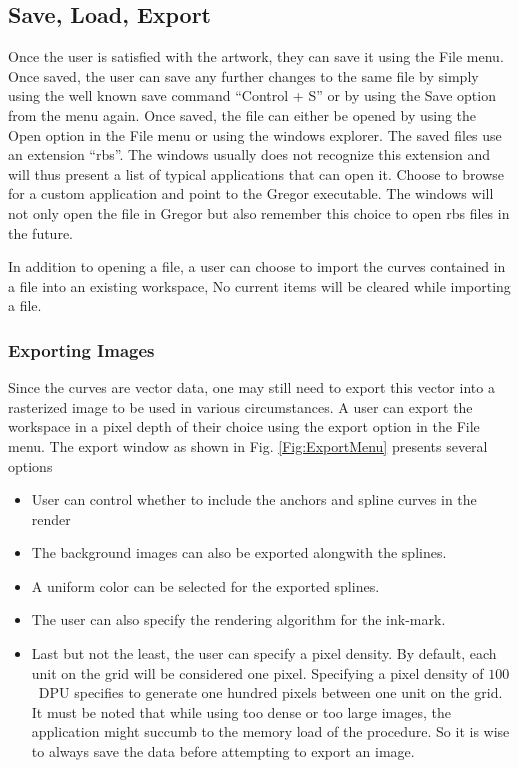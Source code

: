 \subsection{Save, Load, Export}
{
    Once the user is satisfied with the artwork, they can save it using the File menu. Once saved, the user can save any further changes to the same file by simply using the well known save command ``Control + S'' or by using the Save option from the menu again. Once saved, the file can either be opened by using the Open option in the File menu or using the windows explorer. The saved files use an extension ``rbs''. The windows usually does not recognize this extension and will thus present a list of typical applications that can open it. Choose to browse for a custom application and point to the Gregor executable. The windows will not only open the file in Gregor but also remember this choice to open rbs files in the future.

    In addition to opening a file, a user can choose to import the curves contained in a file into an existing workspace, No current items will be cleared while importing a file.

    \subsubsection{Exporting Images}
    {
        Since the curves are vector data, one may still need to export this vector into a rasterized image to be used in various circumstances. A user can export the workspace in a pixel depth of their choice using the export option in the File menu. The export window as shown in Fig. \ref{Fig:ExportMenu} presents several options
        \begin{itemize}
          \item User can control whether to include the anchors and spline curves in the render
          \item The background images can also be exported alongwith the splines.
          \item A uniform color can be selected for the exported splines.
          \item The user can also specify the rendering algorithm for the ink-mark.
          \item Last but not the least, the user can specify a pixel density. By default, each unit on the grid will be considered one pixel. Specifying a pixel density of $100$~DPU specifies to generate one hundred pixels between one unit on the grid. It must be noted that while using too dense or too large images, the application might succumb to the memory load of the procedure. So it is wise to always save the data before attempting to export an image.
        \end{itemize}

}}
